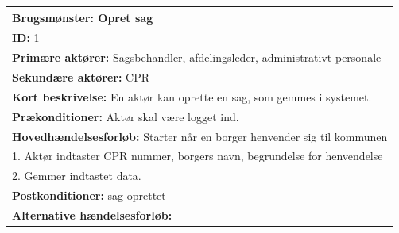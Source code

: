 \begin{center} \label{tab:1}
\begin{longtable}{|p{18cm}|}
\hline
\textbf{Brugsmønster: }Opret sag \\
\hline
\textbf{ID: }1 \\
\hline
\textbf{Primære aktører: }Sagsbehandler, afdelingsleder, administrativt personale\\
\hline
\textbf{Sekundære aktører: }CPR\\
\hline
\textbf{Kort beskrivelse: }En aktør kan oprette en sag, som gemmes i systemet. \\
\hline
\textbf{Prækonditioner: }Aktør skal være logget ind.\\
\hline
\textbf{Hovedhændelsesforløb: }\newline 
Starter når en borger henvender sig til kommunen \\
1. Aktør indtaster CPR nummer, borgers navn, begrundelse for henvendelse \\
2. Gemmer indtastet data.	
\\
\hline
\textbf{Postkonditioner: }sag oprettet\\
\hline
\textbf{Alternative hændelsesforløb: }\\
\hline
\end{longtable}
\end{center}

